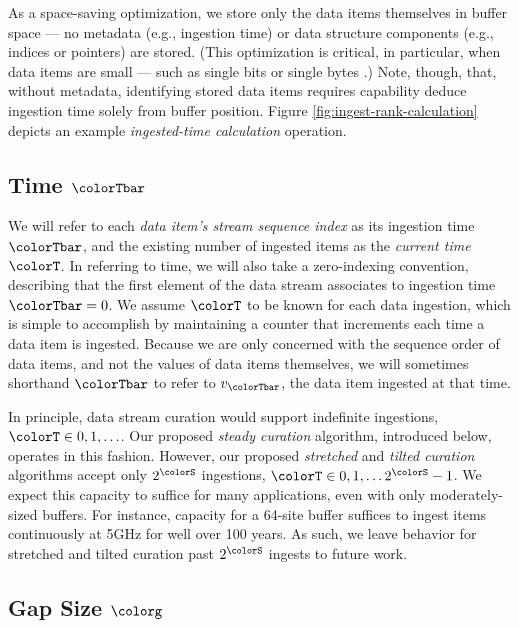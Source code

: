 As a space-saving optimization, we store only the data items themselves in buffer space --- no metadata (e.g., ingestion time) or data structure components (e.g., indices or pointers) are stored.
(This optimization is critical, in particular, when data items are small --- such as single bits or single bytes \citep{moreno2022hereditary}.)
Note, though, that, without metadata, identifying stored data items requires capability deduce ingestion time solely from buffer position.
Figure \ref{fig:ingest-rank-calculation} depicts an example \textit{ingested-time calculation} operation.

\subsection{Time $\colorTbar$}

We will refer to each \textit{data item's stream sequence index} as its ingestion time $\colorTbar$, and the existing number of ingested items as the \textit{current time} $\colorT$.
In referring to time, we will also take a zero-indexing convention, describing that the first element of the data stream associates to ingestion time $\colorTbar=0$.
We assume $\colorT$ to be known for each data ingestion, which is simple to accomplish by maintaining a counter that increments each time a data item is ingested.
Because we are only concerned with the sequence order of data items, and not the values of data items themselves, we will sometimes shorthand $\colorTbar$ to refer to $v_{\colorTbar}$, the data item ingested at that time.

In principle, data stream curation would support indefinite ingestions, $\colorT \in 0, 1, \ldots$.
Our proposed \textit{steady curation} algorithm, introduced below, operates in this fashion.
However, our proposed \textit{stretched} and \textit{tilted curation} algorithms accept only $2^{\colorS}$ ingestions, $\colorT \in 0, 1, \ldots 2^{\colorS} - 1$.
We expect this capacity to suffice for many applications, even with only moderately-sized buffers.
For instance, capacity for a 64-site buffer suffices to ingest items continuously at 5GHz for well over 100 years.
As such, we leave behavior for stretched and tilted curation past $2^{\colorS}$ ingests to future work.

\subsection{Gap Size $\colorg$}

